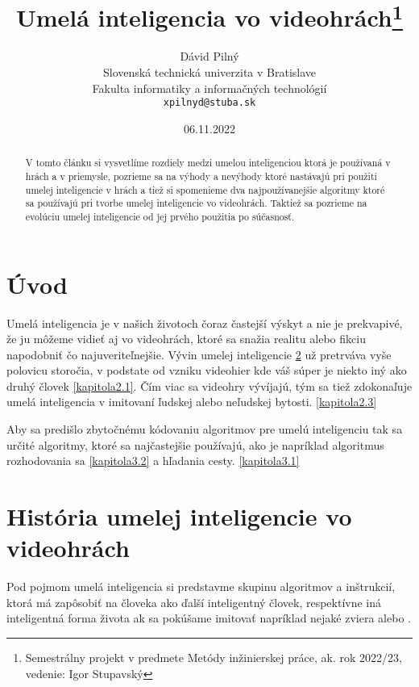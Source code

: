 \documentclass[10pt,oneside,slovak,a4paper]{article}
\title{Umelá inteligencia vo videohrách\thanks{Semestrálny projekt v predmete Metódy inžinierskej práce, ak. rok 2022/23, vedenie: Igor Stupavský}} %
\author{Dávid Pilný\\[2pt]
	{\small Slovenská technická univerzita v Bratislave}\\
	{\small Fakulta informatiky a informačných technológií}\\
	{\small \texttt{xpilnyd@stuba.sk}}
	}
\date{\small 06.11.2022} %
\begin{document}
\maketitle

\begin{abstract}
V tomto článku si vysvetlíme rozdiely medzi umelou inteligenciou ktorá je používaná v hrách a v priemysle, pozrieme sa na výhody a nevýhody ktoré nastávajú pri použití umelej inteligencie v hrách a tiež si spomenieme dva najpoužívanejšie algoritmy ktoré sa používajú pri tvorbe umelej inteligencie vo videohrách. Taktiež sa pozrieme na evolúciu umelej inteligencie od jej prvého použitia po súčasnosť.
\end{abstract}



\section{Úvod} \label{kapitola1}
Umelá inteligencia je v našich životoch čoraz častejší výskyt a nie je prekvapivé, že ju môžeme vidieť aj vo videohrách, ktoré sa snažia realitu alebo fikciu napodobniť čo najuveriteľnejšie. Vývin umelej inteligencie \ref{kapitola2} už pretrváva vyše polovicu storočia, v podstate od vzniku videohier kde váš súper je niekto iný ako druhý človek \ref{kapitola2.1}. Čím viac sa videohry vývíjajú, tým sa tiež zdokonaľuje umelá inteligencia v imitovaní ľudskej alebo neľudskej bytosti. \ref{kapitola2.3}

Aby sa predišlo zbytočnému kódovaniu algoritmov pre umelú inteligenciu tak sa určité algoritmy, ktoré sa najčastejšie používajú, ako je napríklad algoritmus rozhodovania sa \ref{kapitola3.2} a hľadania cesty. \ref{kapitola3.1}



\section{História umelej inteligencie vo videohrách} \label{kapitola2}
Pod pojmom umelá inteligencia si predstavme skupinu algoritmov a inštrukcií, ktorá má zapôsobiť na človeka ako ďalší inteligentný človek, respektívne iná inteligentná forma života ak sa pokúšame imitovať napríklad nejaké zviera alebo .
\end{document}
